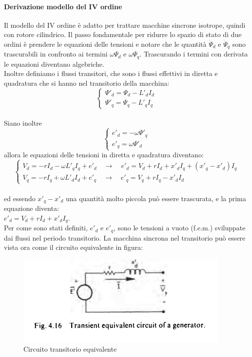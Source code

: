 \documentclass[Lau,noexaminfo]{sapthesis}
\begin{document}
	
	
	\paragraph{Derivazione modello del IV ordine}
	Il modello del IV ordine è adatto per trattare macchine sincrone isotrope, quindi con rotore cilindrico. Il passo fondamentale per ridurre lo spazio di stato di due ordini è prendere le equazioni delle tensioni e notare che le quantità $\dot{\Psi}_d$ e $\dot{\Psi}_q$ sono trascurabili in confronto ai termini $\omega\Psi_d$ e $\omega\Psi_q$.
	Trascurando i termini con derivata le equazioni diventano algebriche.\\
	Inoltre definiamo i flussi transitori, che sono i flussi effettivi in diretta e quadratura che si hanno nel transitorio della macchina:\\
	\[
	\begin{cases}
	\Psi'_d=\Psi_d-L'_dI_d\\
	\Psi'_q=\Psi_q-L'_qI_q
	\end{cases}
	\]\\
	Siano inoltre 
	\[
	\begin{cases}
	e'_d=-\omega\Psi'_q\\
	e'_q=\omega\Psi'_d
	\end{cases}
	\]
	allora le equazioni delle tensioni in diretta e quadratura diventano:\\
	\[
	\begin{cases}
	V_d=-rI_d-\omega L'_qI_q+e'_d \quad \rightarrow \quad e'_d=V_d+rI_d+x'_dI_q+(x'_q-x'_d)I_q\\
	V_q=-rI_q+\omega L'_dI_d+e'_q \quad\rightarrow \quad e'_q=V_q+rI_q-x'_dI_d
	\end{cases}
	\]\\
	ed essendo $x'_q-x'_d$ una quantità molto piccola può essere trascurata, e la prima equazione diventa:\\
	$e'_d=V_d+rI_d+x'_dI_q$.\\
	Per come sono stati definiti, $e'_d$ e $e'_q$, sono le tensioni a vuoto (f.e.m.) sviluppate dai flussi nel periodo transitorio. La macchina sincrona nel transitorio può essere vista ora come il circuito equivalente in figura: \\
	\begin{figure}
		\centering
		\includegraphics[height=0.15\textheight]{circuito_equiv_IV}
		\caption{Circuito transitorio equivalente }
	\end{figure}
\end{document}
